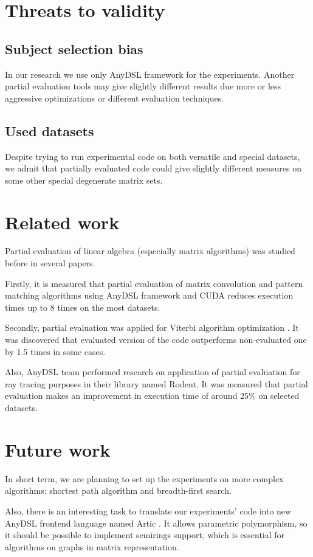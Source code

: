 \documentclass[conference]{IEEEtran}
\begin{document}
\section{Threats to validity}

\subsection{Subject selection bias}
In our research we use only AnyDSL framework for the experiments. Another partial evaluation tools may give slightly different results due more or less aggressive optimizations or different evaluation techniques.

\subsection{Used datasets}
Despite trying to run experimental code on both versatile and special datasets, we admit that partially evaluated code could give slightly different measures on some other special degenerate matrix sets.

\section{Related work}

Partial evaluation of linear algebra (especially matrix algorithms) was studied before in several papers.

Firstly, it is measured \cite{tyurin2020optimizing} that partial evaluation of matrix convolution and pattern matching algorithms using AnyDSL framework and CUDA reduces execution times up to 8 times on the most datasets.

Secondly, partial evaluation was applied for Viterbi algorithm optimization \cite{viterbiseim}. It was discovered that evaluated version of the code outperforms non-evaluated one by 1.5 times in some cases.

Also, AnyDSL team performed research \cite{perard2019rodent} on application of partial evaluation for ray tracing purposes in their library named Rodent. It was measured that partial evaluation  makes an improvement in execution time of around $25\%$ on selected datasets.

\section{Future work}

In short term, we are planning to set up the experiments on more complex algorithms: shortest path algorithm and breadth-first search.

Also, there is an interesting task to translate our experiments' code into new AnyDSL frontend language named Artic \cite{articgit}. It allows parametric polymorphism, so it should be possible to implement semirings support, which is essential for algorithms on graphs in matrix representation.




\end{document}
